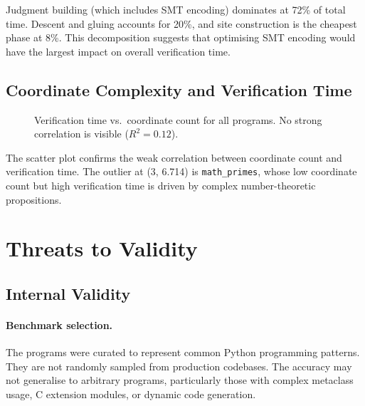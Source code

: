 \documentclass[11pt]{article}
\begin{document}
Judgment building (which includes SMT encoding) dominates at 72\%
of total time.  Descent and gluing accounts for 20\%, and site
construction is the cheapest phase at 8\%.  This decomposition
suggests that optimising SMT encoding would have the largest impact
on overall verification time.

\subsection{Coordinate Complexity and Verification Time}

\begin{figure}[H]
\centering
{}
\caption{Verification time vs.\ coordinate count for all
  \expTotalPrograms{} programs.  No strong correlation is visible
  ($R^2 = 0.12$).}\label{fig:scatter}
\end{figure}

The scatter plot confirms the weak correlation between coordinate
count and verification time.  The outlier at (3, 6.714) is
\texttt{math\_primes}, whose low coordinate count but high
verification time is driven by complex number-theoretic propositions.

\section{Threats to Validity}\label{sec:threats}

\subsection{Internal Validity}

\paragraph{Benchmark selection.}
The \expTotalPrograms{} programs were curated to represent common
Python programming patterns.  They are not randomly sampled from
production codebases.  The \expAccuracy{} accuracy may not generalise
to arbitrary programs, particularly those with complex metaclass
usage, C extension modules, or dynamic code generation.
\end{document}
